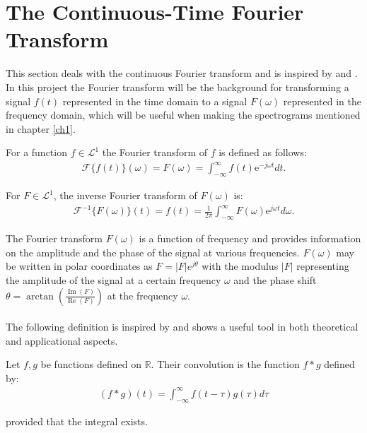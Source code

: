 \section{The Continuous-Time Fourier Transform} \label{sec:cont_Fourier_Transform}
This section deals with the continuous Fourier transform and is inspired by \cite{FourierTrans} and \cite{page 204-224, FAA}. In this project the Fourier transform will be the background for transforming a signal $f(t)$ represented in the time domain to a signal $F(\omega)$ represented in the frequency domain, which will be useful when making the spectrograms mentioned in chapter \ref{ch1}.

\begin{definition} \label{def:Fourier_trans}
For a function $f \in \mathcal{L}^1$ the Fourier transform of $f$ is defined as follows:
\begin{align*}
\mathcal{F}\{f(t)\}(\omega) = F(\omega) = \int_{-\infty}^\infty f(t) \text{e}^{-j \omega t} dt.
\end{align*}
\end{definition}

\begin{definition} \label{def:InverseFourier_trans}
For $F \in \mathcal{L}^1$, the inverse Fourier transform of $F(\omega)$ is:
\begin{align*}
\mathcal{F}^{-1}\{F(\omega)\}(t) = f(t) = \frac{1}{2\pi} \int_{-\infty}^\infty F(\omega) \text{e}^{j \omega t} d\omega.
\end{align*}
\end{definition}

The Fourier transform $F(\omega)$ is a function of frequency and provides information on the amplitude and the phase of the signal at various frequencies. $F(\omega)$ may be written in polar coordinates as $F = |F|e^{j\theta}$ with the modulus $|F|$ representing the amplitude of the signal at a certain frequency $\omega$ and the phase shift $\theta = \arctan \left(\frac{\operatorname{Im}(F)}{\operatorname{Re}(F)} \right)$ at the frequency $\omega$.
\\ \\
The following definition is inspired by \cite{page 206, FAA} and shows a useful tool in both theoretical and applicational aspects.
\begin{definition} \label{def:Convol}
Let $f,g$ be functions defined on $\mathbb{R}$. Their convolution is the function $f*g$ defined by:
\begin{align*}
(f*g)(t) = \int_{-\infty}^\infty f(t-\tau) g(\tau) d\tau
\end{align*}

provided that the integral exists.
\end{definition}

